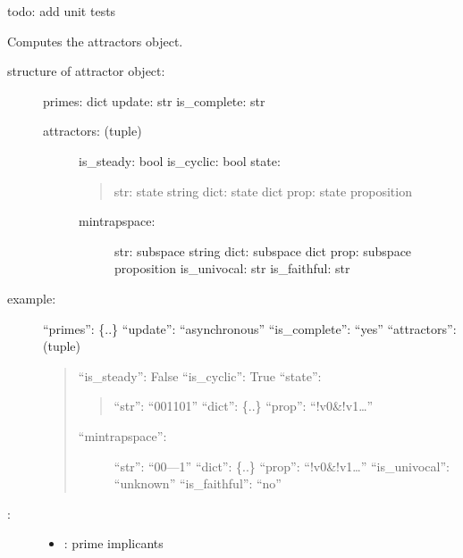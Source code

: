 \documentclass[letterpaper,10pt,english]{sphinxmanual}
\begin{document}
\begin{fulllineitems}
\label{\detokenize{Attractors:PyBoolNet.Attractors.compute_json}}
todo: add unit tests

Computes the attractors object.
\begin{description}
\item[{structure of attractor object:}] \leavevmode
primes: dict
update: str
is\_complete: str
\begin{description}
\item[{attractors: (tuple)}] \leavevmode
is\_steady: bool
is\_cyclic: bool
state:
\begin{quote}

str: state string
dict: state dict
prop: state proposition
\end{quote}
\begin{description}
\item[{mintrapspace:}] \leavevmode
str: subspace string
dict: subspace dict
prop: subspace proposition
is\_univocal: str
is\_faithful: str

\end{description}

\end{description}

\item[{example:}] \leavevmode
“primes”: \{..\}
“update”: “asynchronous”
“is\_complete”: “yes”
“attractors”: (tuple)
\begin{quote}

“is\_steady”: False
“is\_cyclic”: True
“state”:
\begin{quote}

“str”: “001101”
“dict”: \{..\}
“prop”: “!v0\&!v1…”
\end{quote}
\begin{description}
\item[{“mintrapspace”:}] \leavevmode
“str”: “00—1”
“dict”: \{..\}
“prop”: “!v0\&!v1…”
“is\_univocal”: “unknown”
“is\_faithful”: “no”

\end{description}
\end{quote}

\item[{:}] \leavevmode\begin{itemize}
\item {} 
: prime implicants


\end{itemize}
\end{description}
\end{fulllineitems}
\end{document}
